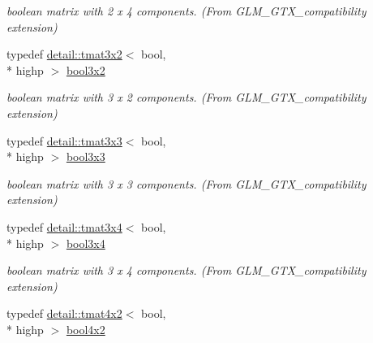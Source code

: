 \begin{DoxyCompactItemize}
\begin{DoxyCompactList}\small\item\em boolean matrix with 2 x 4 components. (From G\-L\-M\-\_\-\-G\-T\-X\-\_\-compatibility extension) \end{DoxyCompactList}\item 
\hypertarget{group__gtx__compatibility_gacf961fda4c64459911f552cbffdbffa8}{typedef \hyperlink{structglm_1_1detail_1_1tmat3x2}{detail\-::tmat3x2}$<$ bool, \\*
highp $>$ \hyperlink{group__gtx__compatibility_gacf961fda4c64459911f552cbffdbffa8}{bool3x2}}\label{group__gtx__compatibility_gacf961fda4c64459911f552cbffdbffa8}

\begin{DoxyCompactList}\small\item\em boolean matrix with 3 x 2 components. (From G\-L\-M\-\_\-\-G\-T\-X\-\_\-compatibility extension) \end{DoxyCompactList}\item 
\hypertarget{group__gtx__compatibility_gae9cc5d3d9c72543e303af4d702bf7b40}{typedef \hyperlink{structglm_1_1detail_1_1tmat3x3}{detail\-::tmat3x3}$<$ bool, \\*
highp $>$ \hyperlink{group__gtx__compatibility_gae9cc5d3d9c72543e303af4d702bf7b40}{bool3x3}}\label{group__gtx__compatibility_gae9cc5d3d9c72543e303af4d702bf7b40}

\begin{DoxyCompactList}\small\item\em boolean matrix with 3 x 3 components. (From G\-L\-M\-\_\-\-G\-T\-X\-\_\-compatibility extension) \end{DoxyCompactList}\item 
\hypertarget{group__gtx__compatibility_gaf68d62e1c790fa3f09ef5e866af690f1}{typedef \hyperlink{structglm_1_1detail_1_1tmat3x4}{detail\-::tmat3x4}$<$ bool, \\*
highp $>$ \hyperlink{group__gtx__compatibility_gaf68d62e1c790fa3f09ef5e866af690f1}{bool3x4}}\label{group__gtx__compatibility_gaf68d62e1c790fa3f09ef5e866af690f1}

\begin{DoxyCompactList}\small\item\em boolean matrix with 3 x 4 components. (From G\-L\-M\-\_\-\-G\-T\-X\-\_\-compatibility extension) \end{DoxyCompactList}\item 
\hypertarget{group__gtx__compatibility_gaa431c2e87e8d78c4780c938a9483d6ff}{typedef \hyperlink{structglm_1_1detail_1_1tmat4x2}{detail\-::tmat4x2}$<$ bool, \\*
highp $>$ \hyperlink{group__gtx__compatibility_gaa431c2e87e8d78c4780c938a9483d6ff}{bool4x2}}\label{group__gtx__compatibility_gaa431c2e87e8d78c4780c938a9483d6ff}


\end{DoxyCompactItemize}
